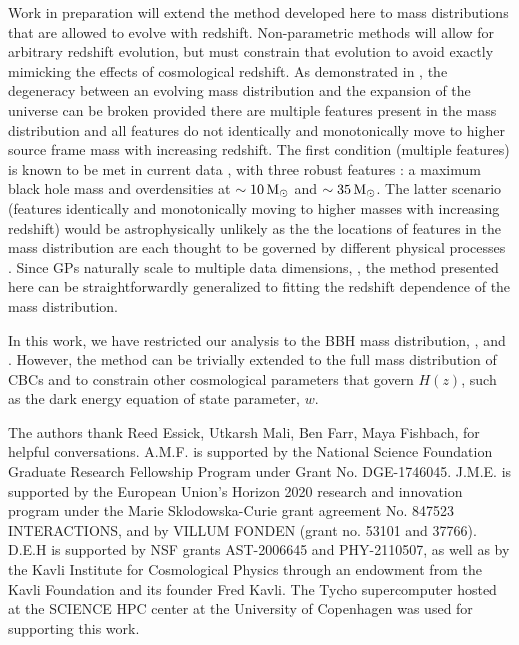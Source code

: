 \documentclass[]{aastex631}
\begin{document}
Work in preparation will extend the method developed here to mass distributions that are allowed to evolve with redshift.
Non-parametric methods will allow for arbitrary redshift evolution, but must constrain that evolution to avoid exactly mimicking the effects of cosmological redshift.
As demonstrated in \citet{ezquiaga_spectral_2022}, the degeneracy between an evolving mass distribution and the expansion of the universe can be broken provided there are multiple features present in the mass distribution and all features do not identically and monotonically move to higher source frame mass with increasing redshift.
The first condition (multiple features) is known to be met in current data \citep{abbott_population_2023}, with three robust features \citep{farah_things_2023}: a maximum black hole mass and overdensities at $\sim10\,\text{M}_{\odot}$ and $\sim35\,\text{M}_{\odot}$.
The latter scenario (features identically and monotonically moving to higher masses with increasing redshift) would be astrophysically unlikely as the the locations of features in the mass distribution are each thought to be governed by different physical processes \citep[e.g.][]{mapelli_binary_2020}.
Since \aclp{GP} naturally scale to multiple data dimensions, \citep{rasmussen_gaussian_2006}, the method presented here can be straightforwardly generalized to fitting the redshift dependence of the mass distribution. 

In this work, we have restricted our analysis to the \ac{BBH} mass distribution, \Ho, and \Omm.
However, the method can be trivially extended to the full mass distribution of \acp{CBC} \citep[e.g.][]{fishbach_does_2020, ezquiaga_spectral_2022} and to constrain other cosmological parameters that govern $H(z)$, such as the dark energy equation of state parameter, $w$. 

\begin{acknowledgments}
    The authors thank Reed Essick, Utkarsh Mali, Ben Farr, Maya Fishbach,  for helpful conversations. 
    A.M.F. is supported by the National Science Foundation Graduate Research Fellowship Program under Grant No. DGE-1746045.
    J.M.E. is supported by the European Union’s Horizon 2020 research and innovation program under the Marie Sklodowska-Curie grant agreement No. 847523 INTERACTIONS, and by VILLUM FONDEN (grant no. 53101 and 37766). 
    D.E.H is supported by NSF grants AST-2006645 and PHY-2110507, as well as by the Kavli Institute for Cosmological Physics through an endowment from the Kavli Foundation and its founder Fred Kavli.
    The Tycho supercomputer hosted at the SCIENCE HPC center at the University of Copenhagen was used for supporting this work.
\end{acknowledgments}
\end{document}
